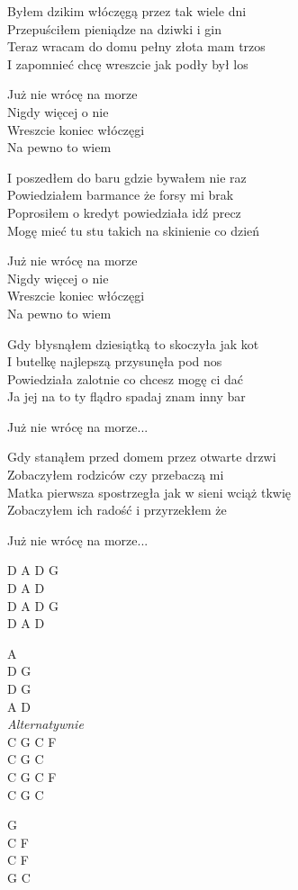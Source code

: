 \begin{text}

    Byłem dzikim włóczęgą przez tak wiele dni\\
    Przepuściłem pieniądze na dziwki i gin\\
    Teraz wracam do domu pełny złota mam trzos\\
    I zapomnieć chcę wreszcie jak podły był los

    \vin Już nie wrócę na morze\\
    \vin Nigdy więcej o nie\\
    \vin Wreszcie koniec włóczęgi\\
    \vin Na pewno to wiem

    I poszedłem do baru gdzie bywałem nie raz\\
    Powiedziałem barmance że forsy mi brak\\
    Poprosiłem o kredyt powiedziała idź precz\\
    Mogę mieć tu stu takich na skinienie co dzień

    \vin Już nie wrócę na morze\\
    \vin Nigdy więcej o nie\\
    \vin Wreszcie koniec włóczęgi\\
    \vin Na pewno to wiem

    Gdy błysnąłem dziesiątką to skoczyła jak kot\\
    I butelkę najlepszą przysunęła pod nos\\
    Powiedziała zalotnie co chcesz mogę ci dać\\
    Ja jej na to ty flądro spadaj znam inny bar

    \vin Już nie wrócę na morze...

    Gdy stanąłem przed domem przez otwarte drzwi\\
    Zobaczyłem rodziców czy przebaczą mi\\
    Matka pierwsza spostrzegła jak w sieni wciąż tkwię\\
    Zobaczyłem ich radość i przyrzekłem że

    \vin Już nie wrócę na morze...

\end{text}
\begin{chord}
    D A D G\\
    D A D\\
    D A D G\\
    D A D

    A\\
    D G\\
    D G\\
    A D\\
    \textit{Alternatywnie}\\
    C G C F\\
    C G C\\
    C G C F\\
    C G C
    
    G\\
    C F\\
    C F\\
    G C
\end{chord}